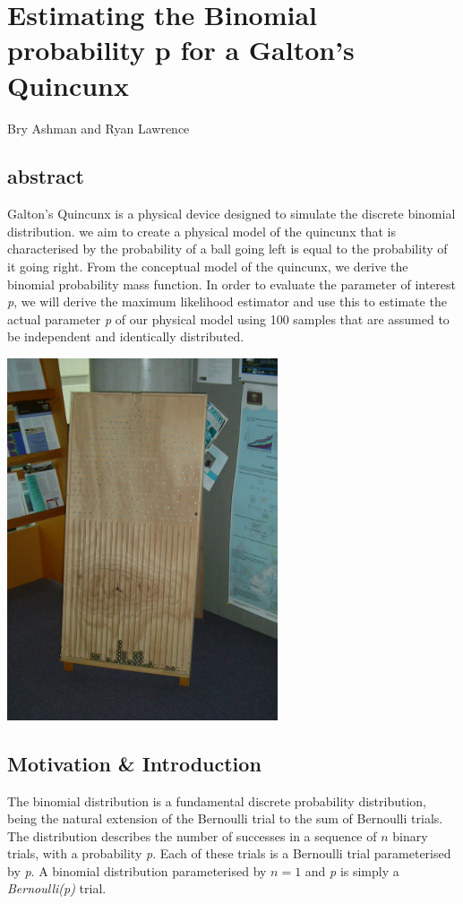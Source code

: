 \section{Estimating the Binomial probability p for a Galton's Quincunx}\label{S:AshmanLawrenceQuincunx}

\begin{center}
Bry Ashman and Ryan Lawrence
\end{center}

\subsection*{abstract}
Galton's Quincunx is a physical device designed to simulate the discrete binomial distribution. we aim to create a physical model of the quincunx that is characterised by the probability of a ball going left is equal to the probability of it going right. From the conceptual model of the quincunx, we derive the binomial probability mass function. In order to evaluate the parameter of interest \textit{p}, we will derive the maximum likelihood estimator and use this to estimate the actual parameter \textit{p} of our physical model using 100 samples that are assumed to be independent and identically distributed.
\begin{center}
\includegraphics[width=8cm]{figures/AshmanLawrenceQuincunx.pdf}
\end{center}

\subsection{Motivation \& Introduction}
The binomial distribution is a fundamental discrete probability distribution, being the natural extension of the Bernoulli trial to the sum of Bernoulli trials. The distribution describes the number of successes in a sequence of $n$ binary trials, with a probability \textit{p}. Each of these trials is a Bernoulli trial parameterised by \textit{p}. A binomial distribution parameterised by $n=1$ and \textit{p} is simply a \textit{Bernoulli(p)} trial.


